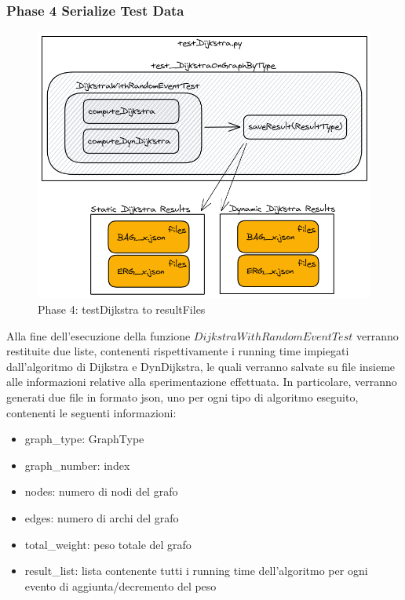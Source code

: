 \documentclass[a4paper]{article}
\begin{document}
\subsubsection{Phase 4 Serialize Test Data}
\begin{figure}[!h]
\includegraphics[scale=0.4]{img/04_testDijkstra_to_resultFiles}
\centering
\caption{Phase 4: testDijkstra to resultFiles}
\end{figure}
Alla fine dell'esecuzione della funzione $DijkstraWithRandomEventTest$ verranno restituite due liste, contenenti rispettivamente i running time impiegati dall'algoritmo di Dijkstra e DynDijkstra, le quali verranno salvate su file insieme alle informazioni relative alla sperimentazione effettuata. In particolare, verranno generati due file in formato json, uno per ogni tipo di algoritmo eseguito, contenenti le seguenti informazioni:
\begin{itemize}
\item graph\_type: GraphType
\item graph\_number: index
\item nodes: numero di nodi del grafo
\item edges: numero di archi del grafo
\item total\_weight: peso totale del grafo
\item result\_list: lista contenente tutti i running time dell'algoritmo per ogni evento di aggiunta/decremento del peso
\end{itemize}
\newpage
\end{document}
